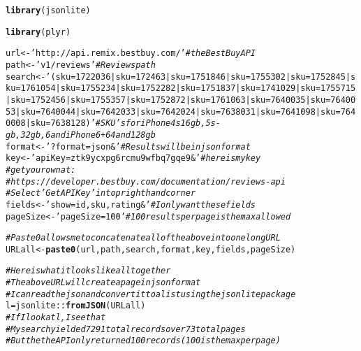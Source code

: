 \documentclass{article}\usepackage[]{graphicx}\usepackage[]{color}
\makeatletter
\newcommand{\hlstr}[1]{\textcolor[rgb]{0.192,0.494,0.8}{#1}}%
\newcommand{\hlcom}[1]{\textcolor[rgb]{0.678,0.584,0.686}{\textit{#1}}}%
\newcommand{\hlopt}[1]{\textcolor[rgb]{0,0,0}{#1}}%
\newcommand{\hlstd}[1]{\textcolor[rgb]{0.345,0.345,0.345}{#1}}%
\newcommand{\hlkwb}[1]{\textcolor[rgb]{0.69,0.353,0.396}{#1}}%
\newcommand{\hlkwd}[1]{\textcolor[rgb]{0.737,0.353,0.396}{\textbf{#1}}}%
\newenvironment{kframe}{%
 \def\at@end@of@kframe{}%
 \ifinner\ifhmode%
  \def\at@end@of@kframe{\end{minipage}}%
  \begin{minipage}{\columnwidth}%
 \fi\fi%
 \def\FrameCommand##1{\hskip\@totalleftmargin \hskip-\fboxsep
 \colorbox{shadecolor}{##1}\hskip-\fboxsep
     \hskip-\linewidth \hskip-\@totalleftmargin \hskip\columnwidth}%
 \MakeFramed {\advance\hsize-\width
   \@totalleftmargin\z@ \linewidth\hsize
   \@setminipage}}%
 {\par\unskip\endMakeFramed%
 \at@end@of@kframe}
\newenvironment{knitrout}{}{} %
\makeatother
\begin{document}
\begin{knitrout}
\color{fgcolor}\begin{kframe}
\begin{alltt}
\hlkwd{library}\hlstd{(jsonlite)}
\end{alltt}


{\ttfamily\noindent\itshape\color{messagecolor}{\#\# \\\#\# Attaching package: 'jsonlite'\\\#\# \\\#\# The following object is masked from 'package:utils':\\\#\# \\\#\#\ \ \ \  View}}\begin{alltt}
\hlkwd{library} \hlstd{(plyr)}

\hlstd{url}  \hlkwb{<-} \hlstr{'http://api.remix.bestbuy.com/'}   \hlcom{# the Best Buy API}
\hlstd{path} \hlkwb{<-} \hlstr{'v1/reviews'}                      \hlcom{# Reviews path}
\hlstd{search} \hlkwb{<-} \hlstr{'(sku=1722036|sku=172463|sku=1751846|sku=1755302|sku=1752845|sku=1761054|sku=1755234|sku=1752282|sku=1751837|sku=1741029|sku=1755715|sku=1752456|sku=1755357|sku=1752872|sku=1761063|sku=7640035|sku=7640053|sku=7640044|sku=7642033|sku=7642024|sku=7638031|sku=7641098|sku=7640008|sku=7638128)'}     \hlcom{# SKU's for iPhone 4s16gb,5s-gb,32gb,6 and iPhone 6+ 64and 128gb}
\hlstd{format} \hlkwb{<-} \hlstr{'?format=json&'}                 \hlcom{# Results will be in json format}
\hlstd{key} \hlkwb{<-} \hlstr{'apiKey=ztk9ycxpg6rcmu9wfbq7gqe9&'} \hlcom{# here is my key}
                                          \hlcom{# get your own at:}
                                          \hlcom{# https://developer.bestbuy.com/documentation/reviews-api}
                                          \hlcom{# Select 'Get API Key' in top right hand corner}
\hlstd{fields} \hlkwb{<-} \hlstr{'show=id,sku,rating&'}           \hlcom{# I only want these fields}
\hlstd{pageSize} \hlkwb{<-} \hlstr{'pageSize=100'}                \hlcom{# 100 results per page is the max allowed}

\hlcom{# Paste0 allows me to concatenate all of the above into one long URL}
\hlstd{URLall} \hlkwb{<-}\hlkwd{paste0}\hlstd{(url, path, search, format, key, fields, pageSize)}

\hlcom{#Here is what it looks like all together}
\hlcom{# The above URL will create a page in json format}
\hlcom{# I can read the json and convert it to a list using the jsonlite package}
\hlstd{l} \hlkwb{=} \hlstd{jsonlite}\hlopt{::}\hlkwd{fromJSON}\hlstd{(URLall)}
\hlcom{# If I look at l, I see that }
\hlcom{# My search yielded 7291  total records over 73 total pages}
\hlcom{# But the the API only returned 100 records (100 is the max per page) }


\end{alltt}
\end{kframe}
\end{knitrout}
\end{document}
